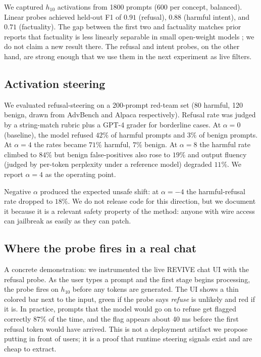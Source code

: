 \documentclass[11pt]{article}
\begin{document}
We captured $h_{10}$ activations from 1800 prompts (600 per concept, balanced). Linear probes achieved held-out F1 of $0.91$ (refusal), $0.88$ (harmful intent), and $0.71$ (factuality). The gap between the first two and factuality matches prior reports that factuality is less linearly separable in small open-weight models \citep{marks2023geometry}; we do not claim a new result there. The refusal and intent probes, on the other hand, are strong enough that we use them in the next experiment as live filters.

\subsection{Activation steering}

We evaluated refusal-steering on a 200-prompt red-team set (80 harmful, 120 benign, drawn from AdvBench and Alpaca respectively). Refusal rate was judged by a string-match rubric plus a GPT-4 grader for borderline cases. At $\alpha=0$ (baseline), the model refused $42\%$ of harmful prompts and $3\%$ of benign prompts. At $\alpha=4$ the rates became $71\%$ harmful, $7\%$ benign. At $\alpha=8$ the harmful rate climbed to $84\%$ but benign false-positives also rose to $19\%$ and output fluency (judged by per-token perplexity under a reference model) degraded $11\%$. We report $\alpha=4$ as the operating point.

Negative $\alpha$ produced the expected unsafe shift: at $\alpha=-4$ the harmful-refusal rate dropped to $18\%$. We do not release code for this direction, but we document it because it is a relevant safety property of the method: anyone with wire access can jailbreak as easily as they can patch.

\subsection{Where the probe fires in a real chat}

A concrete demonstration: we instrumented the live REVIVE chat UI with the refusal probe. As the user types a prompt and the first stage begins processing, the probe fires on $h_{10}$ before any tokens are generated. The UI shows a thin colored bar next to the input, green if the probe says \emph{refuse} is unlikely and red if it is. In practice, prompts that the model would go on to refuse get flagged correctly $87\%$ of the time, and the flag appears about 40 ms before the first refusal token would have arrived. This is not a deployment artifact we propose putting in front of users; it is a proof that runtime steering signals exist and are cheap to extract.
\end{document}
